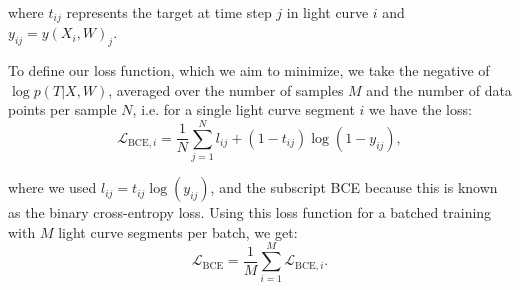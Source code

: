 \noindent where $t_{ij}$ represents the target at time step $j$ in light curve $i$ and $y_{ij} = y(X_i,W)_j$.

To define our loss function, which we aim to minimize, we take the negative of $\log p(T|X,W)$, averaged over the number of samples $M$ and the number of data points per sample $N$, i.e. for a single light curve segment $i$ we have the loss:
\begin{equation}
    \mathcal{L}_{\text{BCE},i} = \frac{1}{N}\sum^{N}_{j=1} l_{ij} + (1 - t_{ij}) \log (1 - y_{ij}),
\end{equation}

\noindent where we used $l_{ij} = t_{ij} \log( y_{ij})$, and the subscript BCE because this is known as the binary cross-entropy loss.
Using this loss function for a batched training with $M$ light curve segments per batch, we get:
\begin{equation}
    \mathcal{L}_{\text{BCE}} = \frac{1}{M} \sum_{i=1}^M \mathcal{L}_{\text{BCE},i}.
\end{equation}

